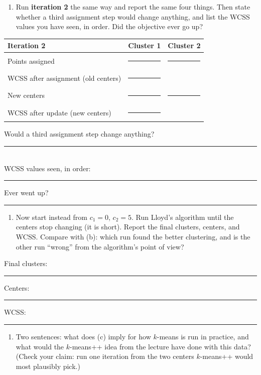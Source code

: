\documentclass[
  11pt,
]{article}
\providecommand{\tightlist}{%
  \setlength{\itemsep}{0pt}\setlength{\parskip}{0pt}}
\newcommand{\answerspace}[1]{\par\vspace*{#1}}  %
\newcommand{\blank}[1][1.2in]{\rule{#1}{0.4pt}}
\begin{document}
\answerspace{2.5in}

\begin{enumerate}
\def\labelenumi{(\alph{enumi})}
\setcounter{enumi}{1}
\tightlist
\item
  Run \textbf{iteration 2} the same way and report the same four things.
  Then state whether a third assignment step would change anything, and
  list the WCSS values you have seen, in order. Did the objective ever
  go up?
\end{enumerate}

\begin{longtable}[]{@{}lll@{}}
\toprule\noalign{}
Iteration 2 & Cluster 1 & Cluster 2 \\
\midrule\noalign{}
\endhead
\bottomrule\noalign{}
\endlastfoot
Points assigned & \blank[1.6in] & \blank[1.6in] \\
WCSS after assignment (old centers) & \blank[1.6in] & \\
New centers & \blank[1.6in] & \blank[1.6in] \\
WCSS after update (new centers) & \blank[1.6in] & \\
\end{longtable}

Would a third assignment step change anything? \blank[0.8in]\\
WCSS values seen, in order: \blank[2.5in]\quad Ever went up?
\blank[0.8in]

\answerspace{2.5in}

\begin{enumerate}
\def\labelenumi{(\alph{enumi})}
\setcounter{enumi}{2}
\tightlist
\item
  Now start instead from \(c_1 = 0\), \(c_2 = 5\). Run Lloyd's algorithm
  until the centers stop changing (it is short). Report the final
  clusters, centers, and WCSS. Compare with (b): which run found the
  better clustering, and is the other run ``wrong'' from the algorithm's
  point of view?
\end{enumerate}

Final clusters: \blank[2.2in] Centers: \blank[1.2in] WCSS: \blank[0.8in]

\answerspace{3in}

\begin{enumerate}
\def\labelenumi{(\alph{enumi})}
\setcounter{enumi}{3}
\tightlist
\item
  Two sentences: what does (c) imply for how \(k\)-means is run in
  practice, and what would the \(k\)-means++ idea from the lecture have
  done with this data? (Check your claim: run one iteration from the two
  centers \(k\)-means++ would most plausibly pick.)
\end{enumerate}
\end{document}
